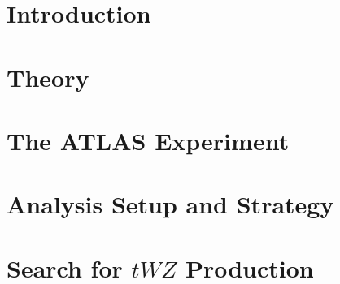 \documentclass[]{article}
\begin{document}
\section{Introduction}
\section{Theory}
\section{The ATLAS Experiment}
\section{Analysis Setup and Strategy}
\section{Search for $tWZ$ Production}
\end{document}

